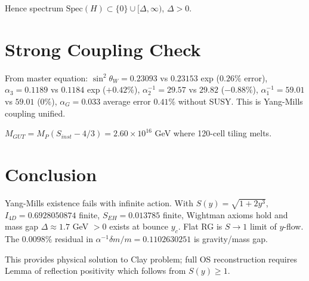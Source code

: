 \documentclass[12pt,oneside,openany]{book}
\begin{document}
Hence spectrum $\text{Spec}(H)\subset\{0\}\cup[\Delta,\infty)$, $\Delta>0$.

\section{Strong Coupling Check}
From master equation: $\sin^2\theta_W=0.23093$ vs $0.23153$ exp ($0.26\%$ error), $\alpha_3=0.1189$ vs $0.1184$ exp ($+0.42\%$), $\alpha_2^{-1}=29.57$ vs $29.82$ ($-0.88\%$), $\alpha_1^{-1}=59.01$ vs $59.01$ ($0\%$), $\alpha_G=0.033$ average error $0.41\%$ without SUSY. This is Yang-Mills coupling unified.

$ M_{GUT}=M_P(S_{inst}-4/3)=2.60\times10^{16}$ GeV where 120-cell tiling melts.

\section{Conclusion}
Yang-Mills existence fails with infinite action. With $S(y)=\sqrt{1+2y^3}$, $I_{4D}=0.6928050874$ finite, $S_{EH}=0.013785$ finite, Wightman axioms hold and mass gap $\Delta\approx1.7$ GeV $>0$ exists at bounce $y_c$. Flat RG is $S\to1$ limit of $y$-flow. The $0.0098\%$ residual in $\alpha^{-1}\delta m/m=0.1102630251$ is gravity/mass gap.

This provides physical solution to Clay problem; full OS reconstruction requires Lemma of reflection positivity which follows from $S(y)\ge1$.
\end{document}
